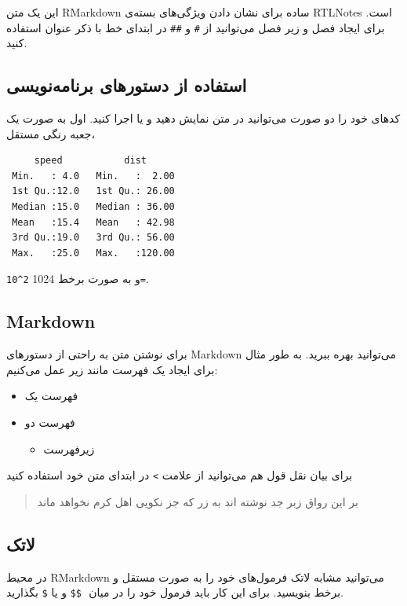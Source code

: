 \documentclass[
]{article}
\providecommand{\tightlist}{%
  \setlength{\itemsep}{0pt}\setlength{\parskip}{0pt}}
\begin{document}
این یک متن RMarkdown ساده برای نشان دادن ویژگی‌های بسته‌ی RTLNotes است.
برای ایجاد فصل و زیر فصل می‌توانید از ‍‍‍‍‍‍\texttt{\#} و \texttt{\#\#}
در ابتدای خط با ذکر عنوان استفاده کنید.

\hypertarget{ux627ux633ux62aux641ux627ux62fux647-ux627ux632-ux62fux633ux62aux648ux631ux647ux627ux6cc-ux628ux631ux646ux627ux645ux647ux646ux648ux6ccux633ux6cc}{%
\subsection{استفاده از دستورهای
برنامه‌نویسی}\label{ux627ux633ux62aux641ux627ux62fux647-ux627ux632-ux62fux633ux62aux648ux631ux647ux627ux6cc-ux628ux631ux646ux627ux645ux647ux646ux648ux6ccux633ux6cc}}

کدهای خود را دو صورت می‌توانید در متن نمایش دهید و یا اجرا کنید. اول به
صورت یک جعبه رنگی مستقل،

\begin{verbatim}
     speed           dist       
 Min.   : 4.0   Min.   :  2.00  
 1st Qu.:12.0   1st Qu.: 26.00  
 Median :15.0   Median : 36.00  
 Mean   :15.4   Mean   : 42.98  
 3rd Qu.:19.0   3rd Qu.: 56.00  
 Max.   :25.0   Max.   :120.00  
\end{verbatim}

و به صورت برخط 1024 \texttt{2\^{}10=}.

\hypertarget{markdown}{%
\subsection{Markdown}\label{markdown}}

برای نوشتن متن به راحتی از دستورهای Markdown می‌توانید بهره ببرید. به
طور مثال برای ایجاد یک فهرست مانند زیر عمل می‌کنیم:

\begin{itemize}
\tightlist
\item
  فهرست یک
\item
  فهرست دو

  \begin{itemize}
  \tightlist
  \item
    زیرفهرست
  \end{itemize}
\end{itemize}

برای بیان نقل قول هم می‌توانید از علامت \texttt{\textgreater{}} در
ابتدای متن خود استفاده کنید

\begin{quote}
بر این رواق زبر جد نوشته اند به زر که جز نکویی اهل کرم نخواهد ماند
\end{quote}

\hypertarget{ux644ux627ux62aux6a9}{%
\subsection{لاتک}\label{ux644ux627ux62aux6a9}}

در محیط RMarkdown می‌توانید مشابه لاتک فرمول‌های خود را به صورت مستقل و
برخط بنویسید. برای این‌ کار باید فرمول خود را در میان ‍‍ ‍‍\texttt{\$\$}
و یا \texttt{\$} بگذارید.
\end{document}
